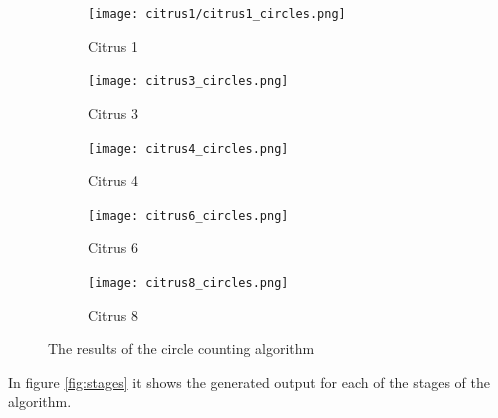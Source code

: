 \documentclass[conference]{IEEEtran}
\begin{document}
\begin{figure}[H]
  \begin{subfigure}{.3\linewidth}
 	 \texttt{[image: citrus1/citrus1\_circles.png]}\hfill
	 \caption{Citrus 1} \label{fig:citrus_results_1}
  \end{subfigure}
   \begin{subfigure}{.3\linewidth}
 	 \texttt{[image: citrus3\_circles.png]}\hfill
	 \caption{Citrus 3}  \label{fig:citrus_results_3}
  \end{subfigure}
   \begin{subfigure}{.3\linewidth}
 	 \texttt{[image: citrus4\_circles.png]}
	 \caption{Citrus 4}  \label{fig:citrus_results_4}
  \end{subfigure}\par\medskip
  
    \begin{subfigure}{.3\linewidth}
 	 \texttt{[image: citrus6\_circles.png]}\hfill
	 \caption{Citrus 6}  \label{fig:citrus_results_6}
  \end{subfigure}
   \begin{subfigure}{.3\linewidth}
 	 \texttt{[image: citrus8\_circles.png]}
	 \caption{Citrus 8}  \label{fig:citrus_results_8}
  \end{subfigure}
  \caption{The results of the circle counting algorithm} \label{fig:citrus_results}
\end{figure}

In figure \ref{fig:stages} it shows the generated output for each of the stages of the algorithm. 
\end{document}
